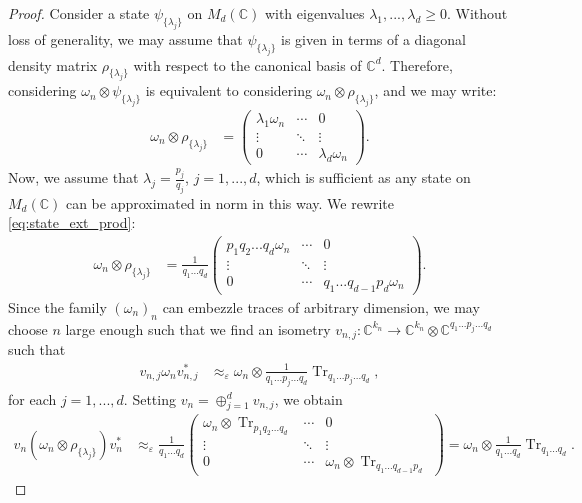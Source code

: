 \documentclass[a4paper, 10pt, onecolumn, accepted=2025-07-22]{quantumarticle}
\theoremstyle{definition}
\newcommand{\ox}{\otimes}
\newcommand{\eps}{\varepsilon}
\DeclareMathOperator{\tr}{Tr}
\DeclareMathOperator{\Tr}{Tr} %
\def\CC{{\mathbb C}}
\newcommand*{\1}{\text{\usefont{U}{bbold}{m}{n}1}}
\begin{document}
\begin{proof}
Consider a state $\psi_{\{\lambda_j\}}$ on $M_{d}(\CC)$ with eigenvalues $\lambda_{1},...,\lambda_{d}\geq0$. 
Without loss of generality, we may assume that $\psi_{\{\lambda_j\}}$ is given in terms of a diagonal density matrix $\rho_{\{\lambda_j\}}$ with respect to the canonical basis of $\CC^{d}$. Therefore, considering $\omega_{n}\ox\psi_{\{\lambda_j\}}$ is equivalent to considering $\omega_{n}\ox\rho_{\{\lambda_j\}}$, and we may write:
\begin{align}
\label{eq:state_ext_prod}
\omega_{n}\ox\rho_{\{\lambda_j\}} & = \begin{pmatrix} \lambda_{1}\omega_{n} & \cdots & 0 \\ \vdots & \ddots & \vdots \\ 0 & \cdots & \lambda_{d}\omega_{n}\end{pmatrix}.
\end{align}
Now, we assume that $\lambda_{j}=\tfrac{p_{j}}{q_{j}}$, $j=1,...,d$, which is sufficient as any state on $M_{d}(\CC)$ can be approximated in norm in this way. We rewrite \cref{eq:state_ext_prod}:
\begin{align}
\omega_{n}\ox\rho_{\{\lambda_j\}} & = \frac{1}{q_{1}...q_{d}}\begin{pmatrix} p_{1}q_{2}...q_{d}\omega_{n} & \cdots & 0 \\ \vdots & \ddots & \vdots \\ 0 & \cdots & q_{1}...q_{d-1}p_{d}\omega_{n}\end{pmatrix}.
\end{align}
Since the family $(\omega_{n})_{n}$ can embezzle traces of arbitrary dimension, we may choose $n$ large enough such that we find an isometry $v_{n,j}:\CC^{k_{n}}\to\CC^{k_{n}}\ox\CC^{q_{1}...p_{j}...q_{d}}$ such that
\begin{align}
v_{n,j}\omega_{n}v_{n,j}^{*} & \approx_{\eps} \omega_{n}\ox\tfrac{1}{q_{1}...p_{j}...q_{d}}\tr_{q_{1}...p_{j}...q_{d}},
\end{align}
for each $j=1,...,d$. Setting $v_{n}=\oplus_{j=1}^{d}v_{n,j}$, we obtain
\begin{align}
v_{n}(\omega_{n}\ox\rho_{\{\lambda_j\}})v_{n}^{*} & \approx_{\eps} \frac{1}{q_{1}...q_{d}}\begin{pmatrix} \omega_{n}\ox\Tr_{p_{1}q_{2}...q_{d}} & \cdots & 0 \\ \vdots & \ddots & \vdots \\ 0 & \cdots & \omega_{n}\ox\Tr_{q_{1}...q_{d-1}p_{d}}\end{pmatrix} = \omega_{n}\ox\tfrac{1}{q_{1}...q_{d}}\tr_{q_{1}...q_{d}}.

\end{align}
\end{proof}
\end{document}
